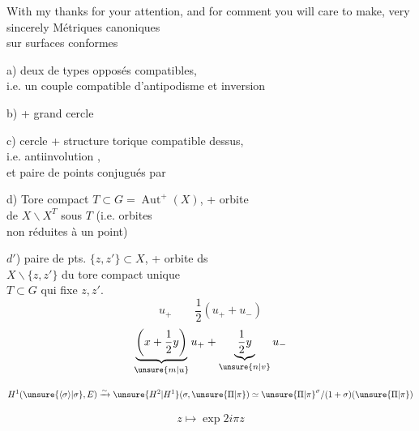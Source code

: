 With my thanks for your attention, and for  comment you will care to make, very sincerely 
Métriques canoniques\\
sur surfaces conformes

a) deux  de types opposés compatibles,\\
i.e. un couple compatible d'antipodisme et inversion

b)   + grand cercle

c) cercle + structure torique compatible dessus,\\
i.e. antiinvolution ,\\
et paire de points conjugués par\\

d) Tore compact $T\subset G=\operatorname{Aut}^+(X)$, + orbite\\
de $X\backslash X^T$ sous $T$ (i.e. orbites\\
non réduites à un point)

$d'$) paire de pts. $\{z,z'\}\subset X$, + orbite ds\\
$X\backslash\{z,z'\}$ du tore compact unique\\
$T\subset G$ qui fixe $z,z'$.
\[
u_+\qquad\frac12(u_++u_-)
\]
\[
\underbrace{\left(x+\frac12y\right)}_{\unsure{m|u}}u_+
+\underbrace{\frac12y}_{\unsure{n|v}}u_-
\]


\[
H^1(\unsure{\langle\sigma\rangle|\sigma},E)\xrightarrow{\sim}
\unsure{H^2|H^1}(\sigma,\unsure{\Pi|\pi})\simeq\unsure{\Pi|\pi}^{\sigma}/(1+\sigma)(\unsure{\Pi|\pi})
\]

\[
z\longmapsto\exp 2i\pi z
\]


